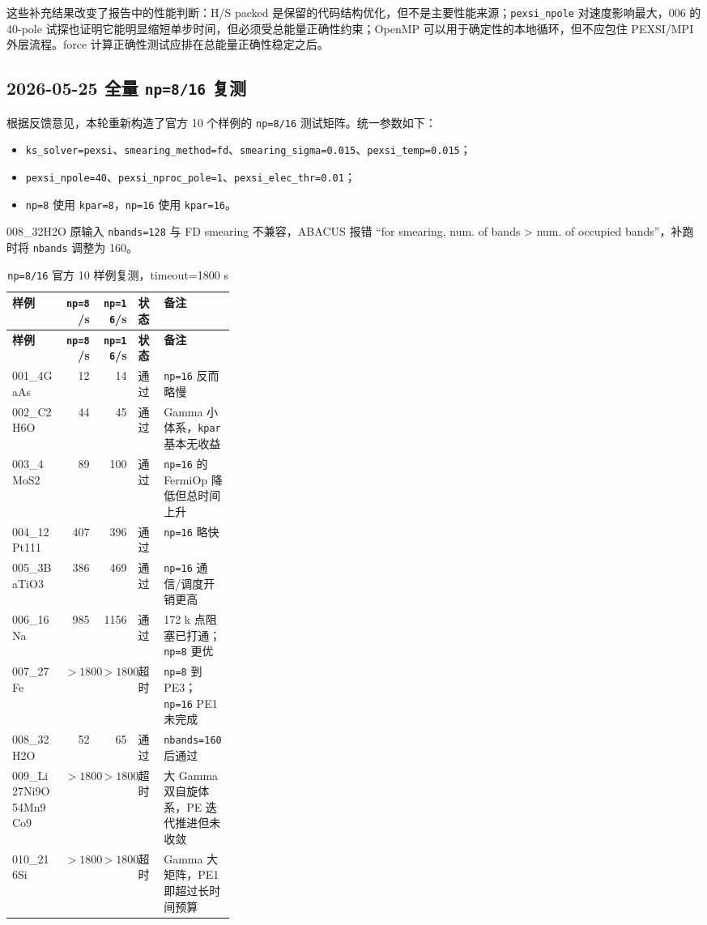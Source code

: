\documentclass[a4paper,11pt]{article}
\newcommand{\code}[1]{\texttt{#1}}
\begin{document}
这些补充结果改变了报告中的性能判断：H/S packed 是保留的代码结构优化，但不是主要性能来源；\code{pexsi\_npole} 对速度影响最大，006 的 40-pole 试探也证明它能明显缩短单步时间，但必须受总能量正确性约束；OpenMP 可以用于确定性的本地循环，但不应包住 PEXSI/MPI 外层流程。force 计算正确性测试应排在总能量正确性稳定之后。

\subsection{2026-05-25 全量 \code{np=8/16} 复测}

根据反馈意见，本轮重新构造了官方 10 个样例的 \code{np=8/16} 测试矩阵。统一参数如下：

\begin{itemize}
    \item \code{ks\_solver=pexsi}、\code{smearing\_method=fd}、\code{smearing\_sigma=0.015}、\code{pexsi\_temp=0.015}；
    \item \code{pexsi\_npole=40}、\code{pexsi\_nproc\_pole=1}、\code{pexsi\_elec\_thr=0.01}；
    \item \code{np=8} 使用 \code{kpar=8}，\code{np=16} 使用 \code{kpar=16}。
\end{itemize}

008\_32H2O 原输入 \code{nbands=128} 与 FD smearing 不兼容，ABACUS 报错 ``for smearing, num. of bands > num. of occupied bands''，补跑时将 \code{nbands} 调整为 160。

{\scriptsize
\begin{longtable}{@{}l r r l p{0.32\linewidth}@{}}
\caption{\code{np=8/16} 官方 10 样例复测，timeout=1800 s}
\label{tab:np8-np16-full-rerun}\\
\toprule
\textbf{样例} & \textbf{\code{np=8}/s} & \textbf{\code{np=16}/s} & \textbf{状态} & \textbf{备注}\\
\midrule
\endfirsthead
\toprule
\textbf{样例} & \textbf{\code{np=8}/s} & \textbf{\code{np=16}/s} & \textbf{状态} & \textbf{备注}\\
\midrule
\endhead
001\_4GaAs & 12 & 14 & 通过 & \code{np=16} 反而略慢\\
002\_C2H6O & 44 & 45 & 通过 & Gamma 小体系，\code{kpar} 基本无收益\\
003\_4MoS2 & 89 & 100 & 通过 & \code{np=16} 的 FermiOp 降低但总时间上升\\
004\_12Pt111 & 407 & 396 & 通过 & \code{np=16} 略快\\
005\_3BaTiO3 & 386 & 469 & 通过 & \code{np=16} 通信/调度开销更高\\
006\_16Na & 985 & 1156 & 通过 & 172 k 点阻塞已打通；\code{np=8} 更优\\
007\_27Fe & \(>1800\) & \(>1800\) & 超时 & \code{np=8} 到 PE3；\code{np=16} PE1 未完成\\
008\_32H2O & 52 & 65 & 通过 & \code{nbands=160} 后通过\\
009\_Li27Ni9O54Mn9Co9 & \(>1800\) & \(>1800\) & 超时 & 大 Gamma 双自旋体系，PE 迭代推进但未收敛\\
010\_216Si & \(>1800\) & \(>1800\) & 超时 & Gamma 大矩阵，PE1 即超过长时间预算\\
\bottomrule
\end{longtable}
}
\end{document}
